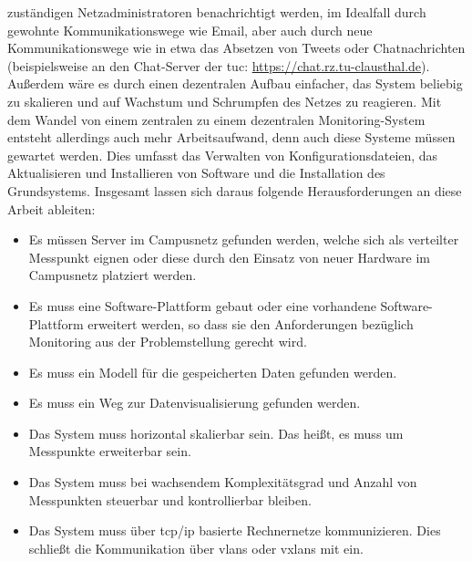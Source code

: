 \documentclass[titlepage]{report}
\begin{document}
zuständigen Netzadministratoren benachrichtigt werden, im Idealfall
durch gewohnte Kommunikationswege wie Email, aber auch durch neue
Kommunikationswege wie in etwa das Absetzen von Tweets oder
Chatnachrichten (beispielsweise an den Chat\hyp{}Server der \gls{tuc}:
\url{https://chat.rz.tu-clausthal.de}). Außerdem wäre es durch
einen dezentralen Aufbau einfacher, das System beliebig zu skalieren
und auf Wachstum und Schrumpfen des Netzes zu reagieren. Mit dem Wandel
von einem zentralen zu einem dezentralen Monitoring-System entsteht
allerdings auch mehr Arbeitsaufwand, denn auch diese Systeme müssen
gewartet werden. Dies umfasst das Verwalten von Konfigurationsdateien,
das Aktualisieren und Installieren von Software und die Installation des
Grundsystems. Insgesamt lassen sich daraus folgende
Herausforderungen an diese Arbeit ableiten:

\begin{itemize}
    \item Es müssen Server im Campusnetz gefunden werden, welche sich
          als verteilter Messpunkt eignen oder diese durch den Einsatz
          von neuer Hardware im Campusnetz platziert werden.
    \item Es muss eine Software\hyp{}Plattform gebaut oder eine
          vorhandene Software\hyp{}Plattform erweitert werden, so dass
          sie den Anforderungen bezüglich Monitoring aus der
          Problemstellung gerecht wird.
    \item Es muss ein Modell für die gespeicherten Daten gefunden
          werden.
    \item Es muss ein Weg zur Datenvisualisierung gefunden werden.
    \item Das System muss horizontal skalierbar sein. Das heißt, es
          muss um Messpunkte erweiterbar sein.
    \item Das System muss bei wachsendem Komplexitätsgrad und Anzahl von
          Messpunkten steuerbar und kontrollierbar bleiben.
    \item Das System muss über \gls{tcp}/\gls{ip} basierte Rechnernetze
          kommunizieren. Dies schließt die Kommunikation über
          \glspl{vlan} oder \glspl{vxlan} mit ein.
\end{itemize}
\end{document}
